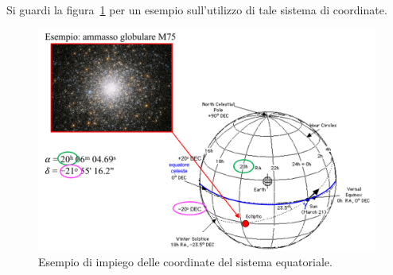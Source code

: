 Si guardi la figura~\ref{fig:esempio-sistema-equatoriale} per un esempio sull'utilizzo di tale sistema di coordinate.

\begin{figure}
\centering
\includegraphics[width=\textwidth]{immagini/esempio-sistema-equatoriale.png}
\caption{Esempio di impiego delle coordinate del sistema equatoriale.}
\label{fig:esempio-sistema-equatoriale}
\end{figure}
